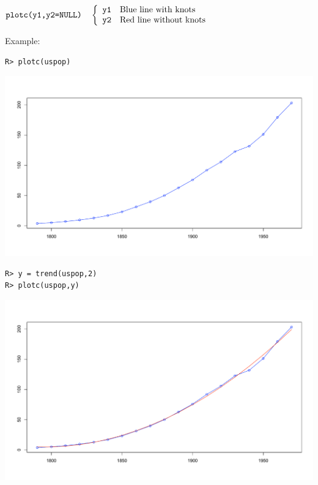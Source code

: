\documentclass[11pt]{article}
\begin{document}
\bigskip
$
\hbox{\tt plotc(y1,y2=NULL)}\quad\left\{\begin{array}{ll}
{\tt y1} & \hbox{Blue line with knots}\\
{\tt y2} & \hbox{Red line without knots}
\end{array}\right.
$

\bigskip
\noindent
Example:
\begin{verbatim}
R> plotc(uspop)
\end{verbatim}

\begin{center}
\includegraphics[scale=0.3]{Rplot-35.pdf}
\end{center}

\begin{verbatim}
R> y = trend(uspop,2)
R> plotc(uspop,y)
\end{verbatim}

\begin{center}
\includegraphics[scale=0.3]{Rplot-36.pdf}
\end{center}

\newpage
\end{document}
